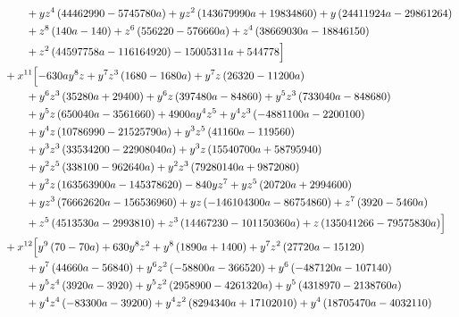 \begin{align*}
&\qquad + y z^{4} \left(44462990 - 5745780 a\right) + y z^{2} \left(143679990 a + 19834860\right) + y \left(24411924 a - 29861264\right)\\
&\qquad + z^{8} \left(140 a - 140\right) + z^{6} \left(556220 - 576660 a\right) + z^{4} \left(38669030 a - 18846150\right)\\
&\qquad + z^{2} \left(44597758 a - 116164920\right) - 15005311 a + 544778\Bigr]\\
&{}+x^{11}\Bigl[- 630 a y^{8} z + y^{7} z^{3} \left(1680 - 1680 a\right) + y^{7} z \left(26320 - 11200 a\right)\\
&\qquad + y^{6} z^{3} \left(35280 a + 29400\right) + y^{6} z \left(397480 a - 84860\right) + y^{5} z^{3} \left(733040 a - 848680\right)\\
&\qquad + y^{5} z \left(650040 a - 3561660\right) + 4900 a y^{4} z^{5} + y^{4} z^{3} \left(- 4881100 a - 2200100\right)\\
&\qquad + y^{4} z \left(10786990 - 21525790 a\right) + y^{3} z^{5} \left(41160 a - 119560\right)\\
&\qquad + y^{3} z^{3} \left(33534200 - 22908040 a\right) + y^{3} z \left(15540700 a + 58795940\right)\\
&\qquad + y^{2} z^{5} \left(338100 - 962640 a\right) + y^{2} z^{3} \left(79280140 a + 9872080\right)\\
&\qquad + y^{2} z \left(163563900 a - 145378620\right) - 840 y z^{7} + y z^{5} \left(20720 a + 2994600\right)\\
&\qquad + y z^{3} \left(76662620 a - 156536960\right) + y z \left(- 146104300 a - 86754860\right) + z^{7} \left(3920 - 5460 a\right)\\
&\qquad + z^{5} \left(4513530 a - 2993810\right) + z^{3} \left(14467230 - 101150360 a\right) + z \left(135041266 - 79575830 a\right)\Bigr]\\
&{}+x^{12}\Bigl[y^{9} \left(70 - 70 a\right) + 630 y^{8} z^{2} + y^{8} \left(1890 a + 1400\right) + y^{7} z^{2} \left(27720 a - 15120\right)\\
&\qquad + y^{7} \left(44660 a - 56840\right) + y^{6} z^{2} \left(- 58800 a - 366520\right) + y^{6} \left(- 487120 a - 107140\right)\\
&\qquad + y^{5} z^{4} \left(3920 a - 3920\right) + y^{5} z^{2} \left(2958900 - 4261320 a\right) + y^{5} \left(4318970 - 2138760 a\right)\\
&\qquad + y^{4} z^{4} \left(- 83300 a - 39200\right) + y^{4} z^{2} \left(8294340 a + 17102010\right) + y^{4} \left(18705470 a - 4032110\right)\\

\end{align*}
